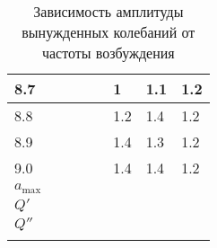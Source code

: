 \begin{longtable}{|l|l|l|l|l|l|l|l|}
	\hline
	8.7        &          &                   &   &      & 1   & 1.1 & 1.2                 \\
	\hline
	8.8        &          &                   &   &      & 1.2 & 1.4 & 1.2                 \\
	\hline
	8.9        &          &                   &   &      & 1.4 & 1.3 & 1.2                 \\
	\hline
	9.0        &          &                   &   &      & 1.4 & 1.4 & 1.2                 \\
	\hline
	$a_{\max}$ &          &                   &   &      &     &     &                     \\
	\hline
	$Q'$       &          &                   &   &      &     &     &                     \\
	\hline
	$Q''$      &          &                   &   &      &     &     &                     \\
	\hline
	\caption{Зависимость амплитуды вынужденных колебаний от частоты возбуждения}
\end{longtable}
